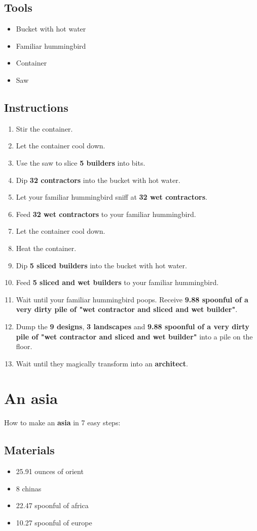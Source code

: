 \documentclass{article}
\begin{document}
\subsection{Tools}\begin{itemize}
\item 
Bucket with hot water
\item 
Familiar hummingbird
\item 
Container
\item 
Saw
\end{itemize}
\subsection{Instructions}\begin{enumerate}
\item 
Stir the container.
\item 
Let the container cool down.
\item 
Use the saw to slice \textbf{5 builders} into bits.
\item 
Dip \textbf{32 contractors} into the bucket with hot water.
\item 
Let your familiar hummingbird sniff at \textbf{32 wet contractors}.
\item 
Feed \textbf{32 wet contractors} to your familiar hummingbird.
\item 
Let the container cool down.
\item 
Heat the container.
\item 
Dip \textbf{5 sliced builders} into the bucket with hot water.
\item 
Feed \textbf{5 sliced and wet builders} to your familiar hummingbird.
\item 
Wait until your familiar hummingbird poops. Receive \textbf{9.88 spoonful of a very dirty pile of "wet contractor and sliced and wet builder"}.
\item 
Dump the \textbf{9 designs}, \textbf{3 landscapes} and \textbf{9.88 spoonful of a very dirty pile of "wet contractor and sliced and wet builder"} into a pile on the floor.
\item 
Wait until they magically transform into an \textbf{architect}.
\end{enumerate}
\newpage
\section{An asia}How to make an \textbf{asia} in 7 easy steps:

\subsection{Materials}\begin{itemize}
\item 
25.91 ounces of orient
\item 
8 chinas
\item 
22.47 spoonful of africa
\item 
10.27 spoonful of europe
\end{itemize}
\end{document}
